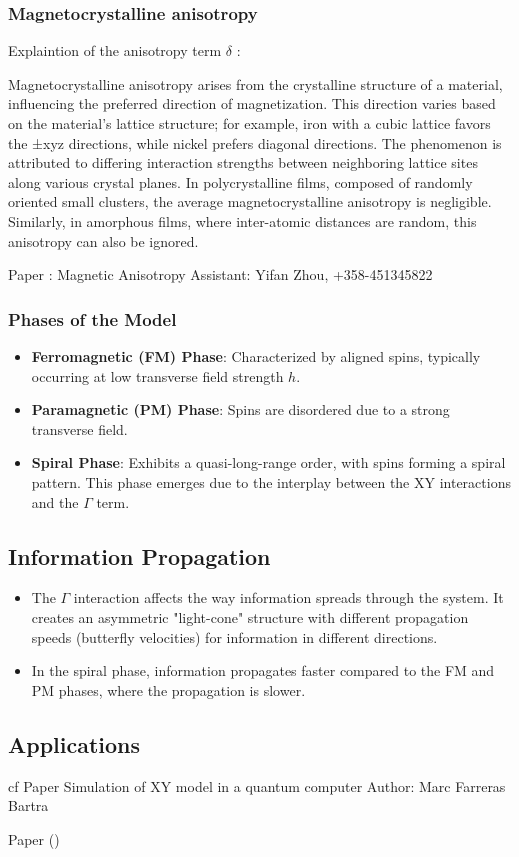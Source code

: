 \subsubsection{Magnetocrystalline anisotropy}
Explaintion of the anisotropy term $\delta$  :

Magnetocrystalline anisotropy arises from the crystalline structure of a material, influencing 
the preferred direction of magnetization. This direction varies based on the material's lattice structure; 
for example, iron with a cubic lattice favors the ±xyz directions, while nickel prefers diagonal directions. 
The phenomenon is attributed to differing interaction strengths between neighboring lattice sites along various crystal planes. 
In polycrystalline films, composed of randomly oriented small clusters, the average magnetocrystalline anisotropy is negligible. 
Similarly, in amorphous films, where inter-atomic distances are random, this anisotropy can also be ignored.

Paper : Magnetic Anisotropy
Assistant: Yifan Zhou, +358-451345822

\subsubsection{Phases of the Model}
\begin{itemize}
    \item \textbf{Ferromagnetic (FM) Phase}: Characterized by aligned spins, typically occurring at low transverse field strength $h$.
    \item \textbf{Paramagnetic (PM) Phase}: Spins are disordered due to a strong transverse field.
    \item \textbf{Spiral Phase}: Exhibits a quasi-long-range order, with spins forming a spiral pattern. This phase emerges due to the interplay between the XY interactions and the $\Gamma$ term.
\end{itemize}

\subsection{Information Propagation}
\begin{itemize}
    \item The $\Gamma$ interaction affects the way information spreads through the system. It creates an asymmetric "light-cone" structure with different propagation speeds (butterfly velocities) for information in different directions.
    \item In the spiral phase, information propagates faster compared to the FM and PM phases, where the propagation is slower.
\end{itemize}

\subsection{Applications} 

cf Paper Simulation of XY model in a quantum computer
Author: Marc Farreras Bartra




Paper ()